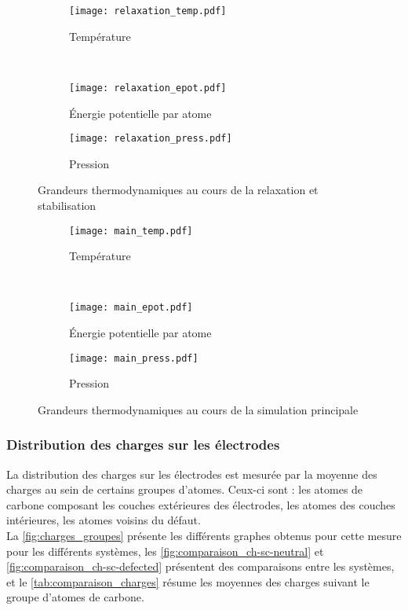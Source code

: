 \begin{figure}[h!]
    \centering
    \begin{subfigure}{.49 \textwidth}
        \centering
        \texttt{[image: relaxation\_temp.pdf]}
        \caption{Température}
    \end{subfigure}%
    ~
    \begin{subfigure}{.49 \textwidth}
        \centering
        \texttt{[image: relaxation\_epot.pdf]}
        \caption{Énergie potentielle par atome}
    \end{subfigure}
    \begin{subfigure}{.49 \textwidth}
        \centering
        \texttt{[image: relaxation\_press.pdf]}
        \caption{Pression}
    \end{subfigure}
    \caption{Grandeurs thermodynamiques au cours de la relaxation et stabilisation}
    \label{fig:relaxation_thermo}
\end{figure}

\begin{figure}[h!]
    \centering
    \begin{subfigure}{.49 \textwidth}
        \centering
        \texttt{[image: main\_temp.pdf]}
        \caption{Température}
    \end{subfigure}%
    ~
    \begin{subfigure}{.49 \textwidth}
        \centering
        \texttt{[image: main\_epot.pdf]}
        \caption{Énergie potentielle par atome}
    \end{subfigure}
    \begin{subfigure}{.49 \textwidth}
        \centering
        \texttt{[image: main\_press.pdf]}
        \caption{Pression}
    \end{subfigure}
    \caption{Grandeurs thermodynamiques au cours de la simulation principale}
    \label{fig:main_thermo}
\end{figure}

    \subsubsection{Distribution des charges sur les électrodes}

La distribution des charges sur les électrodes est mesurée par la moyenne des charges au sein de certains groupes d'atomes. Ceux-ci sont : les atomes de carbone composant les couches extérieures des électrodes, les atomes des couches intérieures, les atomes voisins du défaut.\\
La \autoref{fig:charges_groupes} présente les différents graphes obtenus pour cette mesure pour les différents systèmes, les \autoref{fig:comparaison_ch-sc-neutral} et \ref{fig:comparaison_ch-sc-defected} présentent des comparaisons entre les systèmes, et le \autoref{tab:comparaison_charges} résume les moyennes des charges suivant le groupe d'atomes de carbone.

